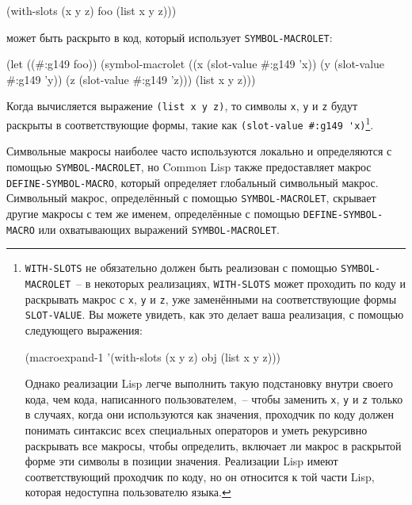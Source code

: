 \begin{myverb}
(with-slots (x y z) foo (list x y z)))
\end{myverb}

\noindent{}может быть раскрыто в код, который использует \lstinline{SYMBOL-MACROLET}:

\begin{myverb}
(let ((#:g149 foo))
  (symbol-macrolet
      ((x (slot-value #:g149 'x))
       (y (slot-value #:g149 'y))
       (z (slot-value #:g149 'z)))
    (list x y z)))
\end{myverb}

Когда вычисляется выражение \lstinline{(list x y z)}, то символы \lstinline{x},
\lstinline{y} и \lstinline{z} будут раскрыты в соответствующие формы, такие как
\lstinline!(slot-value #:g149 'x)!\footnote{\lstinline{WITH-SLOTS} не обязательно должен
  быть реализован с помощью \lstinline{SYMBOL-MACROLET}~-- в некоторых реализациях,
  \lstinline{WITH-SLOTS} может проходить по коду и раскрывать макрос с \lstinline{x},
  \lstinline{y} и \lstinline{z}, уже заменёнными на соответствующие формы
  \lstinline{SLOT-VALUE}.  Вы можете увидеть, как это делает ваша реализация, с помощью
  следующего выражения:

\begin{myverb}
(macroexpand-1 '(with-slots (x y z) obj (list x y z)))
\end{myverb}

Однако реализации Lisp легче выполнить такую подстановку внутри своего кода, чем кода,
написанного пользователем,~-- чтобы заменить \lstinline{x}, \lstinline{y} и \lstinline{z}
только в случаях, когда они используются как значения, проходчик по коду должен понимать
синтаксис всех специальных операторов и уметь рекурсивно раскрывать все макросы, чтобы
определить, включает ли макрос в раскрытой форме эти символы в позиции значения.
Реализации Lisp имеют соответствующий проходчик по коду, но он относится к той части Lisp,
которая недоступна пользователю языка.}\hspace{\footnotenegspace}.

Символьные макросы наиболее часто используются локально и определяются с помощью
\lstinline{SYMBOL-MACROLET}, но Common Lisp также предоставляет макрос
\lstinline{DEFINE-SYMBOL-MACRO}, который определяет глобальный символьный макрос.  Символьный
макрос, определённый с помощью \lstinline{SYMBOL-MACROLET}, скрывает другие макросы с тем же
именем, определённые с помощью \lstinline{DEFINE-SYMBOL-MACRO} или охватывающих выражений
\lstinline{SYMBOL-MACROLET}.

